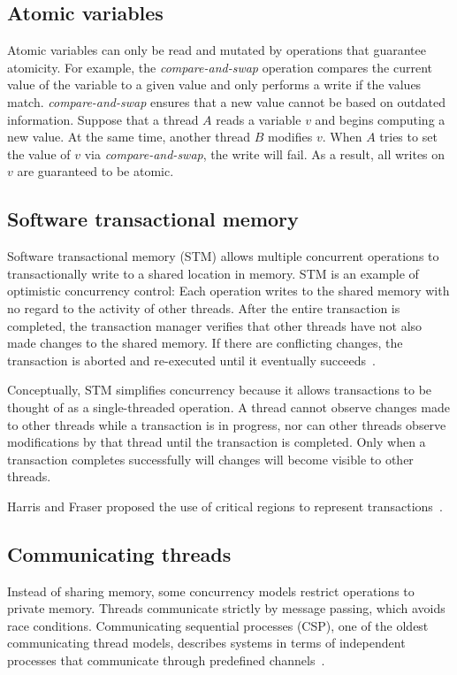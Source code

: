 \documentclass{sig-alternate}
\begin{document}
\subsection{Atomic variables}

Atomic variables can only be read and mutated by operations that guarantee atomicity. For example, the \emph{compare-and-swap} operation compares the current value of the variable to a given value and only performs a write if the values match. \emph{compare-and-swap} ensures that a new value cannot be based on outdated information. Suppose that a thread $A$ reads a variable $v$ and begins computing a new value. At the same time, another thread $B$ modifies $v$. When $A$ tries to set the value of $v$ via \emph{compare-and-swap}, the write will fail. As a result, all writes on $v$ are guaranteed to be atomic.

\subsection{Software transactional memory}

Software transactional memory (STM) allows multiple concurrent operations to transactionally write to a shared location in memory. STM is an example of optimistic concurrency control: Each operation writes to the shared memory with no regard to the activity of other threads. After the entire transaction is completed, the transaction manager verifies that other threads have not also made changes to the shared memory. If there are conflicting changes, the transaction is aborted and re-executed until it eventually succeeds~\cite{Shavit1995}.

Conceptually, STM simplifies concurrency because it allows transactions to be thought of as a single-threaded operation. A thread cannot observe changes made to other threads while a transaction is in progress, nor can other threads observe modifications by that thread until the transaction is completed. Only when a transaction completes successfully will changes will become visible to other threads.

Harris and Fraser proposed the use of critical regions to represent transactions~\cite{Harris2014}.

\subsection{Communicating threads}

Instead of sharing memory, some concurrency models restrict operations to private memory. Threads communicate strictly by message passing, which avoids race conditions. Communicating sequential processes (CSP), one of the oldest communicating thread models, describes systems in terms of independent processes that communicate through predefined channels~\cite{Hoare1978}.
\end{document}
